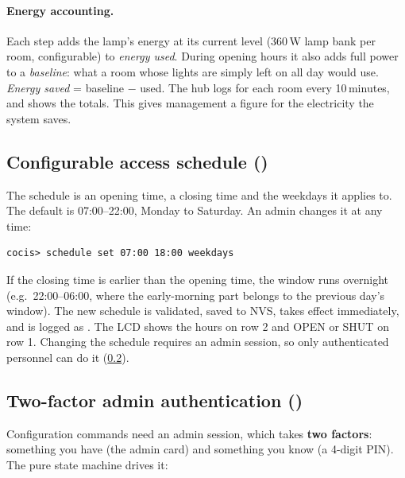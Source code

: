 \paragraph{Energy accounting.} Each step adds the lamp's energy at its current level (360\,W
lamp bank per room, configurable) to \emph{energy used}. During opening hours it also adds full
power to a \emph{baseline}: what a room whose lights are simply left on all day would use.
\emph{Energy saved} = baseline $-$ used. The hub logs 
for each room every 10\,minutes, and  shows the totals. This gives management a figure
for the electricity the system saves.


\subsection{Configurable access schedule ()}
\label{sec:op-schedule}
The schedule is an opening time, a closing time and the weekdays it applies to. The default is
07:00--22:00, Monday to Saturday. An admin changes it at any time:
\begin{lstlisting}[style=console]
cocis> schedule set 07:00 18:00 weekdays
\end{lstlisting}
If the closing time is earlier than the opening time, the window runs overnight (e.g.\
22:00--06:00, where the early-morning part belongs to the previous day's window). The new schedule
is validated, saved to NVS, takes effect immediately, and is logged as \code{CONFIG}. The LCD shows
the hours on row 2 and OPEN or SHUT on row 1. Changing the schedule requires an admin session, so
only authenticated personnel can do it (\cref{sec:op-auth}).


\subsection{Two-factor admin authentication (\req{2.6})}
\label{sec:op-auth}
Configuration commands need an admin session, which takes \textbf{two factors}: something you have
(the admin card) and something you know (a 4-digit PIN). The pure state machine
\file{core_logic/auth_fsm.c} drives it:

